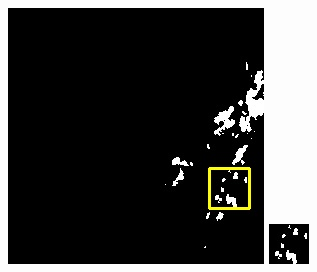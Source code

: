 \documentclass[10pt,UTF8,fntef]{ctexart}
\begin{document}
\begin{figure}[H]
{{\begin{minipage}[b]{0.15\linewidth}
            \includegraphics[width=1\linewidth]{../log/spoon3/cut/LC81570452014213LGN00_06142_my.jpg}\vspace{4pt}
            \includegraphics[width=1\linewidth]{../log/spoon3/cut/tmp_cut_LC81570452014213LGN00_06142_my.jpg}\vspace{4pt}

\end{minipage}}}
\end{figure}
\end{document}
